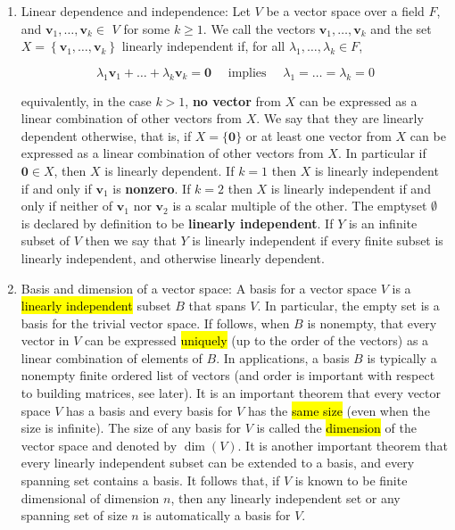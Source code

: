 \documentclass{article}
\begin{document}
    \begin{enumerate}
        \item Linear dependence and independence: Let $V$ be a vector space over a field $F$, and $\mathbf{v}_{1}, \ldots, \mathbf{v}_{k} \in$ $V$ for some $k \geq 1$. We call the vectors $\mathbf{v}_{1}, \ldots, \mathbf{v}_{k}$ and the set $X=\left\{\mathbf{v}_{1}, \ldots, \mathbf{v}_{k}\right\}$ linearly independent if, for all $\lambda_{1}, \ldots, \lambda_{k} \in F$,

        $$
        \lambda_{1} \mathbf{v}_{1}+\ldots+\lambda_{k} \mathbf{v}_{k}=\mathbf{0} \quad \text { implies } \quad \lambda_{1}=\ldots=\lambda_{k}=0
        $$

        equivalently, in the case $k>1$, \textbf{no vector} from $X$ can be expressed as a linear combination of other vectors from $X$. We say that they are linearly dependent otherwise, that is, if $X=\{\mathbf{0}\}$ or at least one vector from $X$ can be expressed as a linear combination of other vectors from $X$. In particular if $\mathbf{0} \in X$, then $X$ is linearly dependent. If $k=1$ then $X$ is linearly independent if and only if $\mathbf{v}_{1}$ is \textbf{nonzero}. If $k=2$ then $X$ is linearly independent if and only if neither of $\mathbf{v}_{1}$ nor $\mathbf{v}_{2}$ is a scalar multiple of the other. The emptyset $\emptyset$ is declared by definition to be \textbf{linearly independent}. If $Y$ is an infinite subset of $V$ then we say that $Y$ is linearly independent if every finite subset is linearly independent, and otherwise linearly dependent.

        \item Basis and dimension of a vector space: A basis for a vector space $V$ is a \hl{linearly independent} subset $B$ that spans $V$. In particular, the empty set is a basis for the trivial vector space. If follows, when $B$ is nonempty, that every vector in $V$ can be expressed \hl{uniquely} (up to the order of the vectors) as a linear combination of elements of $B$. In applications, a basis $B$ is typically a nonempty finite ordered list of vectors (and order is important with respect to building matrices, see later). It is an important theorem that every vector space $V$ has a basis and every basis for $V$ has the \hl{same size} (even when the size is infinite). The size of any basis for $V$ is called the \hl{dimension} of the vector space and denoted by $\operatorname{dim}(V)$. It is another important theorem that every linearly independent subset can be extended to a basis, and every spanning set contains a basis. It follows that, if $V$ is known to be finite dimensional of dimension $n$, then any linearly independent set or any spanning set of size $n$ is automatically a basis for $V$.


\end{enumerate}
\end{document}

